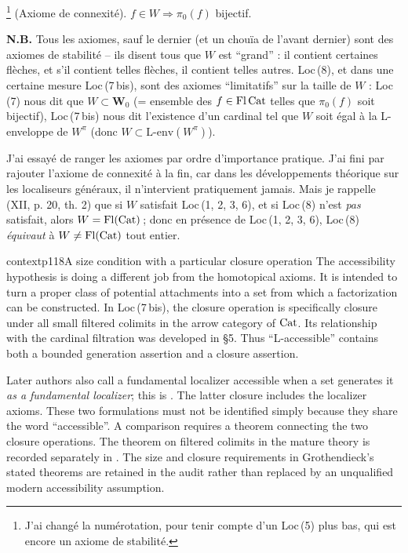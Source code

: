 \begin{description}[labelwidth=5.5em,leftmargin=6.5em,style=sameline]
\item[Loc\,(8)]\footnote[45]{J'ai changé la numérotation, pour tenir compte d'un Loc\,(5) plus bas, qui est encore un axiome de stabilité.} (Axiome de connexité). $f\in W\Longrightarrow \pi_0(f)$ bijectif.
\end{description}

\textbf{N.B.} Tous les axiomes, sauf le dernier (et un chouïa de l'avant dernier) sont des axiomes de stabilité – ils disent tous que $W$ est “grand” : il contient certaines flèches, et s'il contient telles flèches, il contient telles autres. Loc\,(8), et dans une certaine mesure Loc\,(7\,bis), sont des axiomes “limitatifs” sur la taille de $W$ : Loc\,(7) nous dit que $W\subset\mathbf{W}_0$ (= ensemble %
des $f\in\mathrm{Fl}\,\mathrm{Cat}$ telles que $\pi_0(f)$ soit bijectif), Loc\,(7\,bis) nous dit l'existence d'un cardinal tel que $W$ soit égal à la L-enveloppe de $W^\pi$ (donc $W\subset\text{L-env}(W^\pi)$).

J'ai essayé de ranger les axiomes par ordre d'importance pratique. J'ai fini par rajouter l'axiome de connexité à la fin, car dans les développements théorique sur les localiseurs %
généraux, il n'intervient pratiquement jamais. Mais je rappelle (XII, p. 20, th. 2) que si $W$ satisfait Loc\,(1, 2, 3, 6), et si Loc\,(8) n'est \textit{pas} satisfait, alors $W=\mathrm{Fl}(\mathrm{Cat})$\,; donc en présence de Loc\,(1, 2, 3, 6), Loc\,(8) \textit{équivaut} à $W\neq\mathrm{Fl}(\mathrm{Cat})$ tout entier.


\begin{dcomment}{context}{p118}{A size condition with a particular closure operation}
The accessibility hypothesis is doing a different job from the homotopical axioms. It is intended to turn a proper class of potential attachments into a set from which a factorization can be constructed. In Loc\,(7\,bis), the closure operation is specifically closure under all small filtered colimits in the arrow category of $\mathrm{Cat}$. Its relationship with the cardinal filtration was developed in \S5. Thus ``L-accessible'' contains both a bounded generation assertion and a closure assertion.

Later authors also call a fundamental localizer accessible when a set generates it \emph{as a fundamental localizer}; this is \citet[Definition 4.2.10]{Cisinski2006}. The latter closure includes the localizer axioms. These two formulations must not be identified simply because they share the word ``accessible''. A comparison requires a theorem connecting the two closure operations. The theorem on filtered colimits in the mature theory is recorded separately in \citet[Proposition 2.4.12 and Corollary 2.4.14]{Maltsiniotis2020}. The size and closure requirements in Grothendieck's stated theorems are retained in the audit rather than replaced by an unqualified modern accessibility assumption.
\end{dcomment}


